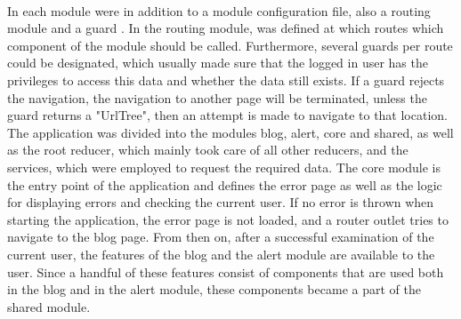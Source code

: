 \documentclass[Bachelor,BIF,english]{twbook}
\begin{document}
\\[\baselineskip]
In each module were in addition to a module configuration file, also a routing module and a guard \cite{AngularGuard}. In the routing module, was defined at which routes which component of the module should be called. Furthermore, several guards per route could be designated, which usually made sure that the logged in user has the privileges to access this data and whether the data still exists. If a guard rejects the navigation, the navigation to another page will be terminated, unless the guard returns a "UrlTree", then an attempt is made to navigate to that location.
\\[\baselineskip]
The application was divided into the modules blog, alert, core and shared, as well as the root reducer, which mainly took care of all other reducers, and the services, which were employed to request the required data. The core module is the entry point of the application and defines the error page as well as the logic for displaying errors and checking the current user. If no error is thrown when starting the application, the error page is not loaded, and a router outlet tries to navigate to the blog page. From then on, after a successful examination of the current user, the features of the blog and the alert module are available to the user. Since a handful of these features consist of components that are used both in the blog and in the alert module, these components became a part of the shared module.
\end{document}
